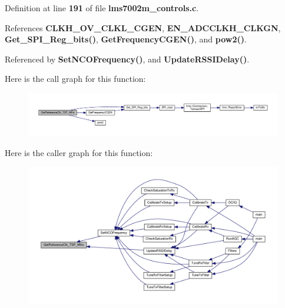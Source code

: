 Definition at line {\bf 191} of file {\bf lms7002m\+\_\+controls.\+c}.



References {\bf C\+L\+K\+H\+\_\+\+O\+V\+\_\+\+C\+L\+K\+L\+\_\+\+C\+G\+EN}, {\bf E\+N\+\_\+\+A\+D\+C\+C\+L\+K\+H\+\_\+\+C\+L\+K\+GN}, {\bf Get\+\_\+\+S\+P\+I\+\_\+\+Reg\+\_\+bits()}, {\bf Get\+Frequency\+C\+G\+E\+N()}, and {\bf pow2()}.



Referenced by {\bf Set\+N\+C\+O\+Frequency()}, and {\bf Update\+R\+S\+S\+I\+Delay()}.



Here is the call graph for this function\+:
\nopagebreak
\begin{figure}[H]
\begin{center}
\leavevmode
\includegraphics[width=350pt]{d7/db8/lms7002m__controls_8c_aba69dada15c144130b08cff13cb54a4c_cgraph}
\end{center}
\end{figure}




Here is the caller graph for this function\+:
\nopagebreak
\begin{figure}[H]
\begin{center}
\leavevmode
\includegraphics[width=350pt]{d7/db8/lms7002m__controls_8c_aba69dada15c144130b08cff13cb54a4c_icgraph}
\end{center}
\end{figure}


